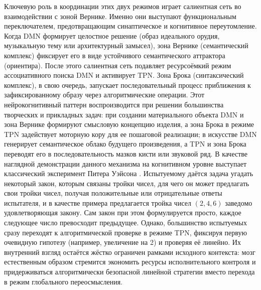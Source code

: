 \documentclass[12pt]{article}
\begin{document}
Ключевую роль в координации этих двух режимов играет салиентная сеть во взаимодействии с зоной Вернике. Именно они выступают функциональным переключателем, предотвращающим синаптическое и когнитивное переутомление. Когда DMN формирует целостное решение (образ идеального орудия, музыкальную тему или архитектурный замысел), зона Вернике (семантический комплекс) фиксирует его в виде устойчивого семантического аттрактора (ориентира). После этого салиентная сеть подавляет ресурсоёмкий режим ассоциативного поиска DMN и активирует TPN. Зона Брока (синтаксический комплекс), в свою очередь, запускает последовательный процесс приближения к зафиксированному образу через алгоритмические операции. Этот нейрокогнитивный паттерн воспроизводится при решении большинства творческих и прикладных задач: при создании материального объекта DMN и зона Вернике формируют смысловую концепцию изделия, а зона Брока в режиме TPN задействует моторную кору для ее пошаговой реализации; в искусстве DMN генерирует семантическое облако будущего произведения, а TPN и зона Брока переводят его в последовательность мазков кисти или звуковой ряд. В качестве наглядной демонстрации данного механизма на когнитивном уровне выступает классический эксперимент Питера Уэйсона \cite{wason-246}. Испытуемому даётся задача угадать некоторый закон, которым связаны тройки чисел, для чего он может предлагать свои тройки чисел, получая положительные или отрицательные ответы испытателя, и в качестве примера предлагается тройка чисел $(2, 4, 6)$ заведомо удовлетворяющая закону. Сам закон при этом формулируется просто, каждое следующее число превосходит предыдущее. Однако, большинство испытуемых сразу переходят к алгоритмической проверке в режиме TPN, фиксируя первую очевидную гипотезу (например, увеличение на 2) и проверяя её линейно. Их внутренний взгляд остаётся жёстко ограничен рамками исходного контекста: мозг естественным образом стремится экономить ресурсы исполнительного контроля и придерживаться алгоритмически безопасной линейной стратегии вместо перехода в режим глобального переосмысления. 
\end{document}
